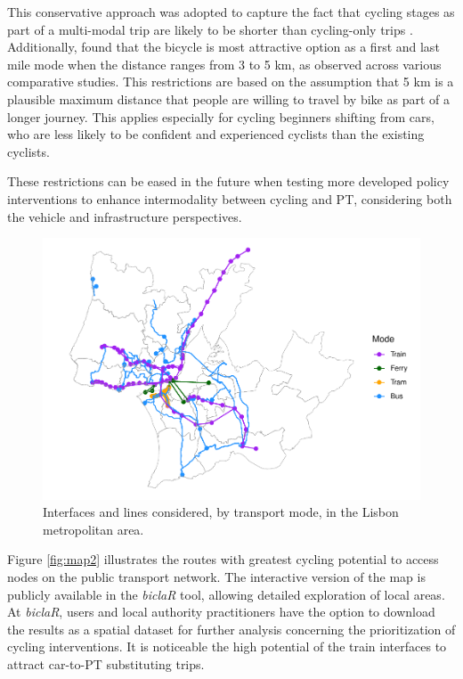 \documentclass[review, doubleblind, 3p,
authoryear]{elsarticle} %
\begin{document}
This conservative approach was adopted to capture the fact that cycling
stages as part of a multi-modal trip are likely to be shorter than
cycling-only trips \citep{vanmil_insights_2021}. Additionally,
\citet{Leferink2017} found that the bicycle is most attractive option as
a first and last mile mode when the distance ranges from 3 to 5 km, as
observed across various comparative studies. This restrictions are based
on the assumption that 5 km is a plausible maximum distance that people
are willing to travel by bike as part of a longer journey. This applies
especially for cycling beginners shifting from cars, who are less likely
to be confident and experienced cyclists than the existing cyclists.

These restrictions can be eased in the future when testing more
developed policy interventions to enhance intermodality between cycling
and PT, considering both the vehicle and infrastructure perspectives.

\begin{figure}

{\centering \includegraphics[width=0.6\linewidth,]{PaperCEUS_rev1_files/figure-latex/map1-1} 

}

\caption{Interfaces and lines considered, by transport mode, in the Lisbon metropolitan area.}\label{fig:map1}
\end{figure}

Figure \ref{fig:map2} illustrates the routes with greatest cycling
potential to access nodes on the public transport network. The
interactive version of the map is publicly available in the
\emph{biclaR} tool, allowing detailed exploration of local areas. At
\emph{biclaR}, users and local authority practitioners have the option
to download the results as a spatial dataset for further analysis
concerning the prioritization of cycling interventions. It is noticeable
the high potential of the train interfaces to attract car-to-PT
substituting trips.
\end{document}
